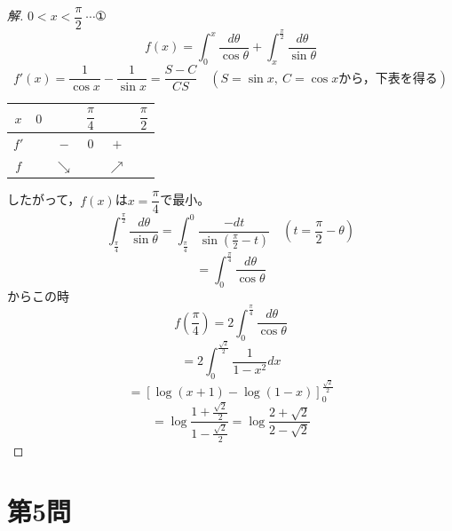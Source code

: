 \documentclass[../main.tex]{subfiles}
\begin{document}
\begin{proof}[解]
  $0<x<\dfrac{\pi}{2}\ \cdots$①
  \[
    f(x)=\int_0^x\frac{d\theta}{\cos\theta}+\int_x^{\frac{\pi}{2}}\frac{d\theta}{\sin\theta}
  \]
  \[
    f'(x)=\frac{1}{\cos x}-\frac{1}{\sin x}=\frac{S-C}{CS} \quad(S=\sin x,\ C=\cos x\text{から，下表を得る})
  \]
  \begin{center}
    \begin{tabular}{c|ccccc}
      $x$ & $0$ & & $\dfrac{\pi}{4}$ & & $\dfrac{\pi}{2}$ \\
      \hline
      $f'$ & & $-$ & $0$ & $+$ & \\
      \hline
      $f$ & & $\searrow$ & & $\nearrow$ &
    \end{tabular}
  \end{center}
  したがって，$f(x)$は$x=\dfrac{\pi}{4}$で最小。
  \[
    \int_{\frac{\pi}{4}}^{\frac{\pi}{2}}\frac{d\theta}{\sin\theta}=\int_{\frac{\pi}{4}}^0\frac{-dt}{\sin\left(\frac{\pi}{2}-t\right)} \quad\left(t=\frac{\pi}{2}-\theta\right)
  \]
  \[
    =\int_0^{\frac{\pi}{4}}\frac{d\theta}{\cos\theta}
  \]
  からこの時
  \[
    f\left(\frac{\pi}{4}\right)=2\int_0^{\frac{\pi}{4}}\frac{d\theta}{\cos\theta}
  \]
  \[
    =2\int_0^{\frac{\sqrt2}{2}}\frac{1}{1-x^2}dx
  \]
  \[
    =\left[\log(x+1)-\log(1-x)\right]_0^{\frac{\sqrt2}{2}}
  \]
  \[
    =\log\frac{1+\frac{\sqrt2}{2}}{1-\frac{\sqrt2}{2}}=\log\frac{2+\sqrt2}{2-\sqrt2}
  \]
\end{proof}

\newpage

\section*{第5問}
\end{document}
